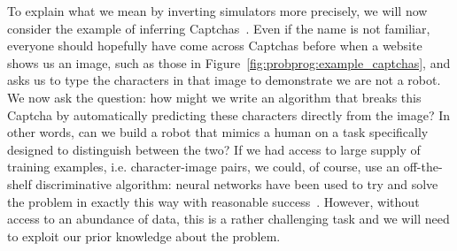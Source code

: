 To explain what we mean by inverting simulators more precisely, we will now consider
the example of inferring Captchas~\citep{mansinghka2013approximate}.   Even if the name is not familiar, 
everyone should hopefully have come across Captchas before when a website shows us an image, such
as those in Figure~\ref{fig:probprog:example_captchas}, and asks us to
type the characters in that image to demonstrate we are not a robot.  We now ask the
question: how might we write an algorithm that breaks this Captcha by 
automatically predicting these characters directly from the image? In other words, 
can we build a robot that mimics a human on a task specifically designed to 
distinguish between the two?  If we had access to large supply of training examples, i.e.
character-image pairs, we could, of course, use an off-the-shelf discriminative algorithm:
neural networks have been used to try and solve the problem in exactly this way with reasonable
success~\citep{von2008recaptcha}.  However, without access to an abundance of data, this is a rather
challenging task and we will need to exploit our prior knowledge about the problem.  

